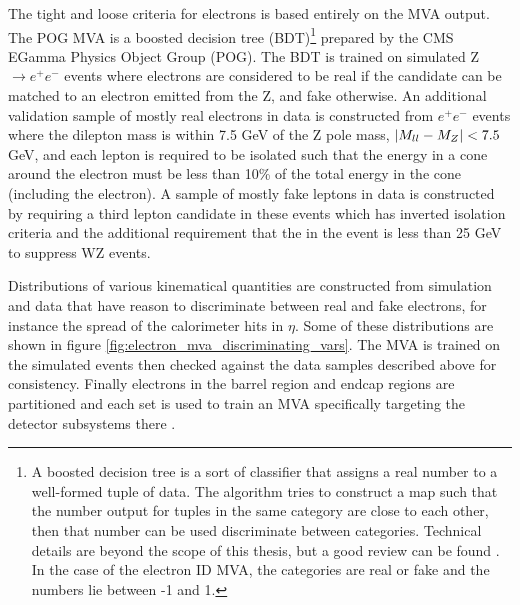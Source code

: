     The tight and loose criteria for electrons is based entirely on the MVA output. The POG MVA is a boosted decision tree (BDT)\footnote{A boosted decision tree is a sort of classifier that assigns a real number to a well-formed tuple of data. The algorithm tries to construct a map such that the number output for tuples in the same category are close to each other, then that number can be used discriminate between categories. Technical details are beyond the scope of this thesis, but a good review can be found \cite{boosting}. In the case of the electron ID MVA, the categories are real or fake and the numbers lie between -1 and 1.} prepared by the CMS EGamma Physics Object Group (POG). The BDT is trained on simulated Z$\to e^+ e^-$ events where electrons are considered to be real if the candidate can be matched to an electron emitted from the Z, and fake otherwise. An additional validation sample of mostly real electrons in data is constructed from $e^+ e^-$ events where the dilepton mass is within 7.5 GeV of the Z pole mass, $\lvert M_{ll} - M_Z \rvert < 7.5$ GeV, and each lepton is required to be isolated such that the energy in a cone around the electron must be less than 10\% of the total energy in the cone (including the electron). A sample of mostly fake leptons in data is constructed by requiring a third lepton candidate in these events which has inverted isolation criteria and the additional requirement that the \MET in the event is less than 25 GeV to suppress WZ events. 

    Distributions of various kinematical quantities are constructed from simulation and data that have reason to discriminate between real and fake electrons, for instance the spread of the calorimeter hits in $\eta$. Some of these distributions are shown in figure \ref{fig:electron_mva_discriminating_vars}. The MVA is trained on the simulated events then checked against the data samples described above for consistency. Finally electrons in the barrel region and endcap regions are partitioned and each set is used to train an MVA specifically targeting the detector subsystems there \cite{Electron_reco}. 

